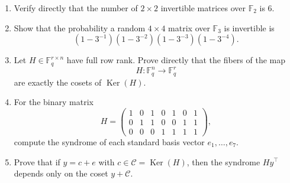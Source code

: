 \documentclass[11pt]{article}
\newcommand{\F}{\mathbb{F}}
\newcommand{\Ker}{\operatorname{Ker}}
\newcommand{\cC}{\mathcal{C}}
\theoremstyle{definition}
\theoremstyle{plain}
\begin{document}
	\begin{enumerate}[leftmargin=2em]
		\item Verify directly that the number of \(2\times 2\) invertible matrices over \(\F_2\) is \(6\).
		\item Show that the probability a random \(4\times 4\) matrix over \(\F_3\) is invertible is
		\[
		(1-3^{-1})(1-3^{-2})(1-3^{-3})(1-3^{-4}).
		\]
		\item Let \(H\in \F_q^{r\times n}\) have full row rank. Prove directly that the fibers of the map
		\[
		H:\F_q^n\to \F_q^r
		\]
		are exactly the cosets of \(\Ker(H)\).
		\item For the binary matrix
		\[
		H=
		\begin{pmatrix}
			1&0&1&0&1&0&1\\
			0&1&1&0&0&1&1\\
			0&0&0&1&1&1&1
		\end{pmatrix},
		\]
		compute the syndrome of each standard basis vector \(e_1,\dots,e_7\).
		\item Prove that if \(y=c+e\) with \(c\in \cC=\Ker(H)\), then the syndrome \(Hy^\top\) depends only on the coset \(y+\cC\).
	\end{enumerate}
	
\end{document}
